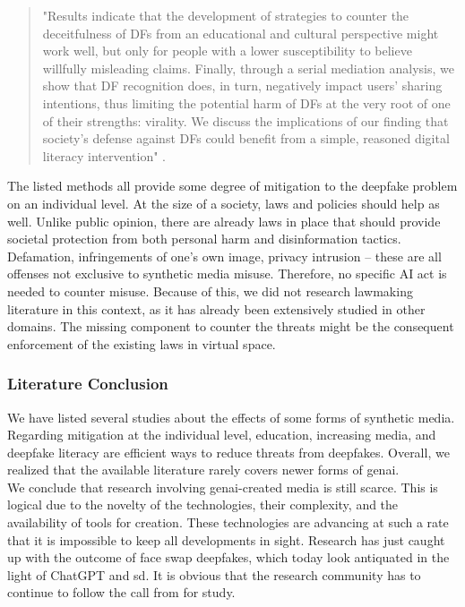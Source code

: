 \documentclass[
  a4paper,  %
  twoside,  %
  bibliography=totoc,
  headsepline,
  cleardoublepage=empty,
  parskip=half,
  draft=false
]{scrbook}
\begin{document}
\begin{quotation}
"Results indicate that the development of strategies to counter the deceitfulness of DFs from an educational and cultural perspective might work well, but only for people with a lower susceptibility to believe willfully misleading claims. Finally, through a serial mediation analysis, we show that DF recognition does, in turn, negatively impact users' sharing intentions, thus limiting the potential harm of DFs at the very root of one of their strengths: virality. We discuss the implications of our finding that society's defense against DFs could benefit from a simple, reasoned digital literacy intervention" \cite{iacobucciDeepfakesUnmaskedEffects2021}.
\end{quotation}

The listed methods all provide some degree of mitigation to the deepfake problem on an individual level. At the size of a society, laws and policies should help as well. Unlike public opinion, there are already laws in place that should provide societal protection from both personal harm and disinformation tactics. Defamation, infringements of one's own image, privacy intrusion – these are all offenses not exclusive to synthetic media misuse. Therefore, no specific AI act is needed to counter misuse. Because of this, we did not research lawmaking literature in this context, as it has already been extensively studied in other domains. The missing component to counter the threats might be the consequent enforcement of the existing laws in virtual space. 

\subsubsection*{Literature Conclusion}
We have listed several studies about the effects of some forms of synthetic media. Regarding mitigation at the individual level, education, increasing media, and deepfake literacy are efficient ways to reduce threats from deepfakes. Overall, we realized that the available literature rarely covers newer forms of \gls{genai}. \\
We conclude that research involving \gls{genai}-created media is still scarce. This is logical due to the novelty of the technologies, their complexity, and the availability of tools for creation. These technologies are advancing at such a rate that it is impossible to keep all developments in sight. Research has just caught up with the outcome of face swap deepfakes, which today look antiquated in the light of ChatGPT and \gls{sd}. It is obvious that the research community has to continue to follow the call from \citet{hancockSocialImpactDeepfakes2021} for study.
\end{document}
